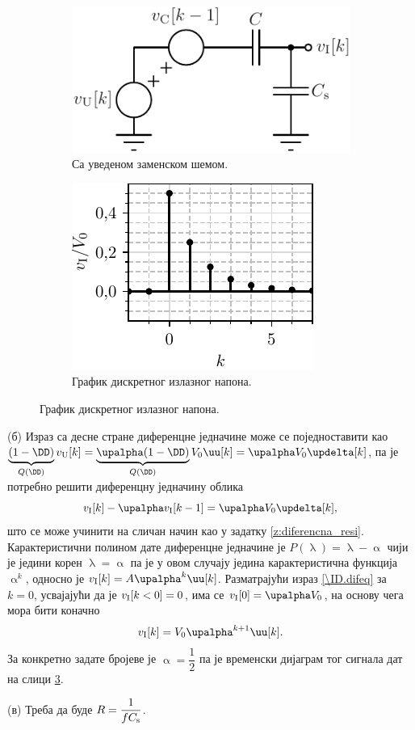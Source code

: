 \begin{figure}[ht!]
    \begin{subfigure}{0.49\textwidth}
        \centering
        \includegraphics[scale=1]{fig/sc-sol.pdf}
        \caption{Са уведеном заменском шемом.}
        \label{\ID.zam_sch}
    \end{subfigure}
    \begin{subfigure}{0.49\textwidth}
        \centering
        \includegraphics[scale=1]{fig/sc_plot.pdf}
        \caption{График дискретног излазног напона.}
        \label{\ID.fig.b}
    \end{subfigure}
\end{figure}

(б) Израз са десне стране диференцне једначине може се поједноставити као 
$\underbrace{(1 - \DD)}_{Q(\DD)} v_{\rm U}[k] = \underbrace{\upalpha(1 - \DD)}_{Q(\DD)} V_0 \uu[k] =\upalpha V_0 \updelta[k]$, па је потребно 
решити диференцну једначину облика
\begin{equation}
    v_{\rm I}[k] - \upalpha v_{\rm I}[k-1] = \upalpha V_0 \updelta[k], \label{\ID.difeq}
\end{equation}
што се може учинити на сличан начин као у задатку \ref{z:diferencna_resi}. Карактеристични полином дате диференцне једначине је 
$P(\uplambda) = \uplambda - \upalpha$ чији је једини корен $\uplambda = \upalpha$ па је у овом случају једина карактеристична 
функција $\upalpha^k$,  односно је $v_{\rm I}[k] = A \upalpha^k \uu[k]$. Разматрајући израз \eqref{\ID.difeq} за $k=0$, усвајајући
да је $v_{\rm I}[k < 0] = 0$, има се $v_{\rm I}[0] = \upalpha V_0$, на основу чега мора бити коначно
\begin{equation}
    v_{\rm I}[k] = V_0 \upalpha^{k+1} \uu[k]. 
\end{equation}
За конкретно задате бројеве је $\upalpha = \dfrac{1}{2}$ па је временски дијаграм тог сигнала дат на слици 
\ref{\ID.fig.b}.

(в) Треба да буде $R = \dfrac{1}{fC_{\rm s}}$.